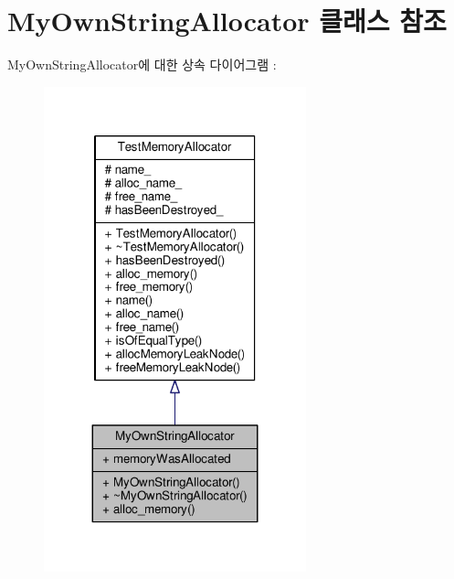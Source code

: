\hypertarget{class_my_own_string_allocator}{}\section{My\+Own\+String\+Allocator 클래스 참조}
\label{class_my_own_string_allocator}


My\+Own\+String\+Allocator에 대한 상속 다이어그램 \+: 
\nopagebreak
\begin{figure}[H]
\begin{center}
\leavevmode
\includegraphics[width=215pt]{class_my_own_string_allocator__inherit__graph}
\end{center}
\end{figure}


